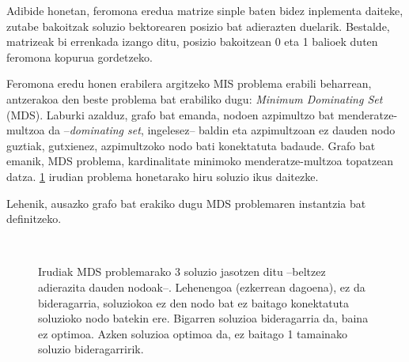 \documentclass[eu]{ifirak}\usepackage[]{graphicx}\usepackage[]{color}
\newcommand{\eng}[1]{\textit{#1}}
\begin{document}
Adibide honetan, feromona eredua matrize sinple baten bidez inplementa daiteke, zutabe bakoitzak soluzio bektorearen posizio bat adierazten duelarik. Bestalde, matrizeak bi errenkada izango ditu, posizio bakoitzean 0 eta 1 balioek duten feromona kopurua gordetzeko. 

Feromona eredu honen erabilera argitzeko MIS problema erabili beharrean, antzerakoa den beste problema bat erabiliko dugu: \eng{Minimum Dominating Set} (MDS). Laburki azalduz, grafo bat emanda, nodoen azpimultzo bat menderatze-multzoa da --\eng{dominating set}, ingelesez-- baldin eta azpimultzoan ez dauden nodo guztiak, gutxienez, azpimultzoko nodo bati konektatuta badaude. Grafo bat emanik, MDS problema, kardinalitate minimoko menderatze-multzoa topatzean datza. \ref{fig:MDS} irudian problema honetarako hiru soluzio ikus daitezke. 

Lehenik, ausazko grafo bat erakiko dugu MDS problemaren instantzia bat definitzeko.

\begin{figure}[t]
\qquad
{}\qquad
{}\\
\caption{Irudiak MDS problemarako 3 soluzio jasotzen ditu --beltzez adierazita dauden nodoak--. Lehenengoa (ezkerrean dagoena), ez da bideragarria, soluziokoa ez den nodo bat ez baitago konektatuta soluzioko nodo batekin ere. Bigarren soluzioa bideragarria da, baina ez optimoa. Azken soluzioa optimoa da, ez baitago 1 tamainako soluzio bideragarririk.}\label{fig:MDS}
\end{figure}
\end{document}
